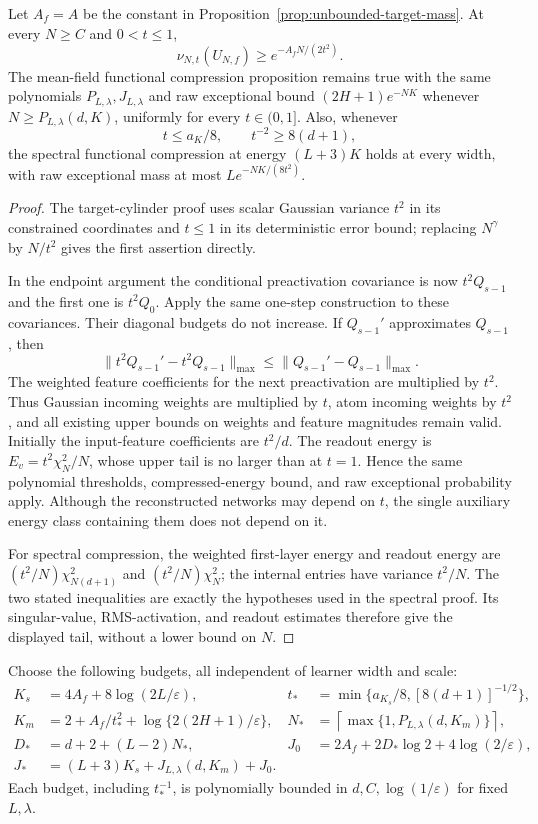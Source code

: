 \begin{lemma}
\label{lem:uniform-scale-ingredients}
Let $A_f=A$ be the constant in
Proposition~\ref{prop:unbounded-target-mass}. At every $N\ge C$ and
$0<t\le1$,
\[
 \nu_{N,t}(U_{N,f})\ge e^{-A_fN/(2t^2)}.
\]
The mean-field functional compression proposition remains true with the
same polynomials $P_{L,\lambda},J_{L,\lambda}$ and raw exceptional bound
$(2H+1)e^{-NK}$ whenever $N\ge P_{L,\lambda}(d,K)$, uniformly for
every $t\in(0,1]$.
Also, whenever
\[
 t\le a_K/8,\qquad t^{-2}\ge8(d+1),
\]
the spectral functional compression at energy $(L+3)K$ holds at every
width, with raw exceptional mass at most $Le^{-NK/(8t^2)}$.
\end{lemma}
\begin{proof}
The target-cylinder proof uses scalar Gaussian variance $t^2$ in its
constrained coordinates and $t\le1$ in its deterministic error bound;
replacing $N^\gamma$ by $N/t^2$ gives the first assertion directly.

In the endpoint argument the conditional preactivation covariance is
now $t^2Q_{s-1}$ and the first one is $t^2Q_0$. Apply the same one-step
construction to these covariances. Their diagonal budgets do not increase.
If $Q_{s-1}'$ approximates $Q_{s-1}$, then
\[
 \|t^2Q_{s-1}'-t^2Q_{s-1}\|_{\max}
 \le\|Q_{s-1}'-Q_{s-1}\|_{\max}.
\]
The weighted feature coefficients for the next preactivation are
multiplied by $t^2$. Thus Gaussian incoming weights are multiplied by
$t$, atom incoming weights by $t^2$, and all existing upper bounds on
weights and feature magnitudes remain valid. Initially the input-feature
coefficients are $t^2/d$. The readout energy is
$E_v=t^2\chi_N^2/N$, whose upper tail is no larger than at $t=1$.
Hence the same polynomial thresholds, compressed-energy bound, and
raw exceptional probability apply. Although the reconstructed networks
may depend on $t$, the single auxiliary energy class containing them does
not depend on it.

For spectral compression, the weighted first-layer energy and readout
energy are $(t^2/N)\chi^2_{N(d+1)}$ and $(t^2/N)\chi^2_N$;
the internal entries have variance $t^2/N$. The two stated inequalities
are exactly the hypotheses used in the spectral proof. Its singular-value,
RMS-activation, and readout estimates therefore give the displayed tail,
without a lower bound on $N$.
\end{proof}

Choose the following budgets, all independent of learner width and scale:
\begin{align*}
 K_s&=4A_f+8\log(2L/\varepsilon),&
 t_*&=\min\{a_{K_s}/8,[8(d+1)]^{-1/2}\},\\
 K_m&=2+A_f/t_*^2+\log\{2(2H+1)/\varepsilon\},&
 N_*&=\left\lceil\max\{1,P_{L,\lambda}(d,K_m)\}\right\rceil,\\
 D_*&=d+2+(L-2)N_*,&
 J_0&=2A_f+2D_*\log2+4\log(2/\varepsilon),\\
 J_*&=(L+3)K_s+J_{L,\lambda}(d,K_m)+J_0.
\end{align*}
Each budget, including $t_*^{-1}$, is polynomially bounded in
$d,C,\log(1/\varepsilon)$ for fixed $L,\lambda$.

